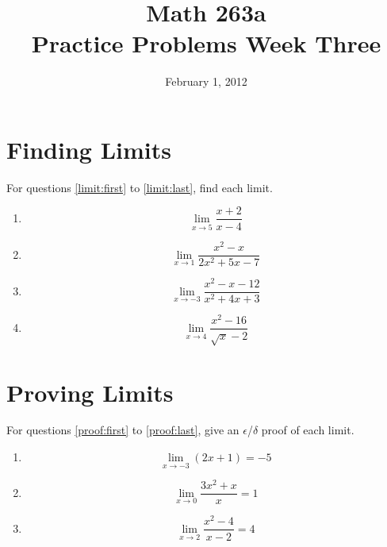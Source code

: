 \documentclass{exam}
\title{Math 263a \\ Practice Problems Week Three}
\date{February 1, 2012}
\begin{document}
\maketitle

\section{Finding Limits}
For questions \ref{limit:first} to \ref{limit:last}, find each limit.

\begin{enumerate}

\item
\label{limit:first}
\[
  \lim_{x \to 5} \frac{x + 2}{x - 4}
\]

\item
\[
  \lim_{x \to 1} \frac{x^2 - x}{2x^2 + 5x - 7} 
\]

\item
\[
  \lim_{x \to -3} \frac{x^2 - x - 12}{x^2 + 4x + 3}
\]

\item
\label{limit:last}
\[
  \lim_{x \to 4} \frac{x^2 - 16}{\sqrt{x} - 2}
\]

\end{enumerate}
\section{Proving Limits}

For questions \ref{proof:first} to \ref{proof:last}, give an $\epsilon$/$\delta$ proof of each limit.

\begin{enumerate}[resume]
\item
\label{proof:first} 
\[
  \lim_{x \to -3} (2x + 1) = -5
\]

\item
\[
  \lim_{x \to 0} \frac{3x^2 + x}{x} = 1
\]

\item
\label{proof:last}
\[
  \lim_{x \to 2} \frac{x^2 - 4}{x-2} = 4
\]

\end{enumerate}
\end{document}
